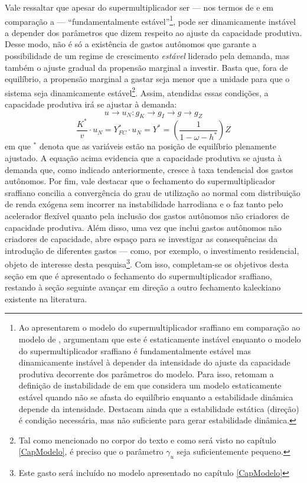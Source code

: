 Vale ressaltar que apesar do supermultiplicador ser --- nos termos de \textcite{hicks_capital_1965} e em comparação a \textcite{harrod_essay_1939} --- ``fundamentalmente estável''\footnote{
	Ao apresentarem o modelo do supermultiplicador sraffiano em comparação ao modelo de \textcite{harrod_essay_1939}, \textcite{serrano_trouble_2017} argumentam que este é estaticamente instável enquanto o modelo do supermultiplicador sraffiano é fundamentalmente estável mas dinamicamente instável à depender da intensidade do ajuste da capacidade produtiva decorrente dos parâmetros do modelo.
	Para isso, retomam a definição de instabilidade de  \textcite{hicks_capital_1965} em que considera um modelo estaticamente estável quando não se afasta do equilíbrio enquanto a estabilidade dinâmica depende da intensidade. Destacam ainda que a estabilidade estática (direção) é condição necessária, mas não suficiente para gerar estabilidade dinâmica.
}, pode ser dinamicamente instável a depender dos parâmetros que dizem respeito ao ajuste da capacidade produtiva. Desse modo, não é só a existência de gastos autônomos que garante a possibilidade de um regime de crescimento \textit{estável} liderado pela demanda, mas também o ajuste gradual da propensão marginal a investir. Basta que, fora de equilíbrio, a propensão marginal a gastar seja menor que a unidade para que o sistema seja dinamicamente estável\footnote{Tal como mencionado no corpor do texto e como será visto no capítulo \ref{CapModelo}, é preciso que o parâmetro $\gamma_u$ seja suficientemente pequeno.}. Assim, atendidas essas condições, a capacidade produtiva irá se ajustar à demanda:
$$
u \to u_N : g_K \to g_I \to g \to  g_Z
$$
$$
\frac{K^*}{v}\cdot u_N = Y_{FC}^*\cdot u_N = Y^* = \left(\frac{1}{1 - \omega - h^*}\right)Z
$$
em que $^*$ denota que as variáveis estão na posição de equilíbrio plenamente ajustado.
A equação acima evidencia que a capacidade produtiva se ajusta à demanda que, como indicado anteriormente, cresce à taxa tendencial dos gastos autônomos. 
Por fim, vale destacar que o fechamento do supermultiplicador sraffiano concilia a convergência do grau de utilização ao normal com distribuição de renda exógena sem incorrer na instabilidade harrodiana e o faz tanto pelo acelerador flexível quanto pela inclusão dos gastos autônomos não criadores de capacidade produtiva.
Além disso, uma vez que inclui gastos autônomos não criadores de capacidade, abre espaço para se investigar as consequências da introdução de diferentes gastos --- como, por exemplo, o investimento residencial, objeto de interesse desta pesquisa\footnote{
	Este gasto será incluído no modelo apresentado no capítulo \ref{CapModelo}
}.
Com isso, completam-se os objetivos desta seção em que é apresentado o fechamento do supermultiplicador sraffiano, restando à seção seguinte avançar em direção a outro fechamento kaleckiano existente na literatura.





